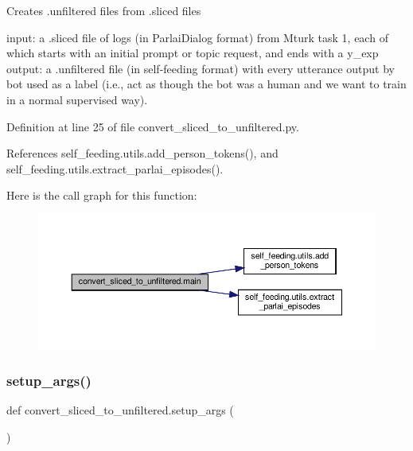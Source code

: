 \begin{DoxyVerb}Creates .unfiltered files from .sliced files

input: a .sliced file of logs (in ParlaiDialog format) from Mturk task 1, each of
    which starts with an initial prompt or topic request, and ends with a y_exp
output: a .unfiltered file (in self-feeding format) with every utterance output by
    bot used as a label (i.e., act as though the bot was a human and we want to
    train in a normal supervised way).
\end{DoxyVerb}
 

Definition at line 25 of file convert\+\_\+sliced\+\_\+to\+\_\+unfiltered.\+py.



References self\+\_\+feeding.\+utils.\+add\+\_\+person\+\_\+tokens(), and self\+\_\+feeding.\+utils.\+extract\+\_\+parlai\+\_\+episodes().

Here is the call graph for this function\+:
\nopagebreak
\begin{figure}[H]
\begin{center}
\leavevmode
\includegraphics[width=350pt]{namespaceconvert__sliced__to__unfiltered_a90657fd736afc2f0af90b8cbdb3ee2aa_cgraph}
\end{center}
\end{figure}
\mbox{\label{namespaceconvert__sliced__to__unfiltered_a21ac677a0cb0c5ba6129567460c1ee35}} 
\subsubsection{\texorpdfstring{setup\+\_\+args()}{setup\_args()}}
{\footnotesize\ttfamily def convert\+\_\+sliced\+\_\+to\+\_\+unfiltered.\+setup\+\_\+args (\begin{DoxyParamCaption}{ }\end{DoxyParamCaption})}



